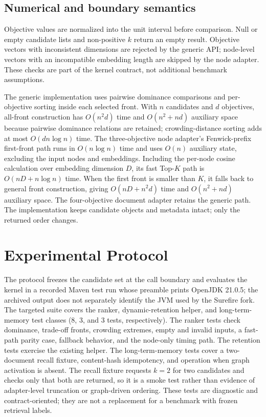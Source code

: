 \documentclass[review,12pt]{elsarticle}
\begin{document}
\subsection{Numerical and boundary semantics}

Objective values are normalized into the unit interval before comparison. Null or empty candidate lists and non-positive $k$ return an empty result. Objective vectors with inconsistent dimensions are rejected by the generic API; node-level vectors with an incompatible embedding length are skipped by the node adapter. These checks are part of the kernel contract, not additional benchmark assumptions.

The generic implementation uses pairwise dominance comparisons and per-objective sorting inside each selected front. With $n$ candidates and $d$ objectives, all-front construction has $O(n^2d)$ time and $O(n^2+nd)$ auxiliary space because pairwise dominance relations are retained; crowding-distance sorting adds at most $O(dn\log n)$ time. The three-objective node adapter's Fenwick-prefix first-front path runs in $O(n\log n)$ time and uses $O(n)$ auxiliary state, excluding the input nodes and embeddings. Including the per-node cosine calculation over embedding dimension $D$, its fast Top-$K$ path is $O(nD+n\log n)$ time. When the first front is smaller than $K$, it falls back to general front construction, giving $O(nD+n^2d)$ time and $O(n^2+nd)$ auxiliary space. The four-objective document adapter retains the generic path. The implementation keeps candidate objects and metadata intact; only the returned order changes.

\section{Experimental Protocol}
\label{sec:protocol}

The protocol freezes the candidate set at the call boundary and evaluates the kernel in a recorded Maven test run whose preamble prints OpenJDK 21.0.5; the archived output does not separately identify the JVM used by the Surefire fork. The targeted suite covers the ranker, dynamic-retention helper, and long-term-memory test classes (8, 3, and 3 tests, respectively). The ranker tests check dominance, trade-off fronts, crowding extremes, empty and invalid inputs, a fast-path parity case, fallback behavior, and the node-only timing path. The retention tests exercise the existing helper. The long-term-memory tests cover a two-document recall fixture, content-hash idempotency, and operation when graph activation is absent. The recall fixture requests $k=2$ for two candidates and checks only that both are returned, so it is a smoke test rather than evidence of adapter-level truncation or graph-driven ordering. These tests are diagnostic and contract-oriented; they are not a replacement for a benchmark with frozen retrieval labels.
\end{document}
